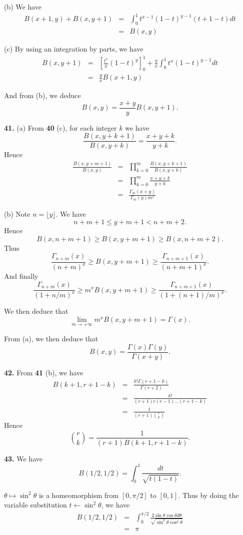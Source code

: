 \documentclass[a4paper,12pt]{article}
\newcommand{\newpar}[1]{\bigskip \noindent \textbf{#1.}}
\newcommand{\subpar}[1]{\medskip \noindent (#1)}
\newcommand{\la}{\leftarrow}
\begin{document}
\subpar{b} We have
\begin{eqnarray*}
  B(x+1, y) + B(x, y+1) &=& \int_0^1 t^{x-1}(1-t)^{y-1}(t + 1 - t)
  dt\\
  &=& B(x, y)
\end{eqnarray*}

\subpar{c} By using an integration by parts, we have
\begin{eqnarray*}
  B(x, y+1) &=& \left[ \frac{t^x}{x}(1-t)^y \right]_0^1 +
  \frac{y}{x}\int_0^1 t^x (1-t)^{y-1} dt \\
  &=& \frac{y}{x} B(x+1, y)
\end{eqnarray*}

And from (b), we deduce
\[ B(x, y) = \frac{x+y}{y} B(x, y+1).\]

\newpar{41} \subpar{a} From \textbf{40} (c), for each integer $k$ we have
\[ \frac{B(x, y + k + 1)}{B(x, y+k)} = \frac{x + y + k}{y+k}.\]
Hence
\begin{eqnarray*}
  \frac{B(x, y+m+1)}{B(x, y)} &=& \prod_{k=0}^m \frac{B(x,
    y+k+1)}{B(x, y+k)} \\
  &=& \prod_{k=0}^m \frac{x+y+k}{y+k} \\
  &=& \frac{\Gamma_m(x+y)}{\Gamma_m(y)m^x}
\end{eqnarray*}

\subpar{b} Note $n = \lfloor y\rfloor$.  We have
\[ n + m + 1 \le y + m + 1 < n+m+2.\]
Hence
\[ B(x, n+m+1) \ge B(x, y+m+1) \ge B(x, n+m+2).\]
Thus
\[ \frac{\Gamma_{n+m}(x)}{(n+m)^x} \ge B(x, y+m+1) \ge
\frac{\Gamma_{n+m+1}(x)}{(n+m+1)^x}.\]
And finally
\[ \frac{\Gamma_{n+m}(x)}{(1+n/m)^x} \ge m^x B(x, y+m+1) \ge
\frac{\Gamma_{n+m+1}(x)}{(1+(n+1)/m)^x}.\]

We then deduce that
\[ \lim_{m \to +\infty} m^x B(x, y+m+1) = \Gamma(x).\]

From (a), we then deduce that
\[ B(x, y) = \frac{\Gamma(x) \Gamma(y)}{\Gamma(x+y)}.\]

\newpar{42}  From \textbf{41} (b), we have
\begin{eqnarray*}
  B(k+1, r+1-k) &=& \frac{k!\Gamma(r+1-k)}{\Gamma(r+2)} \\
  &=& \frac{k!}{(r+1)r(r-1) \ldots (r+1-k)} \\
  &=& \frac{1}{(r+1){r \choose k}}
\end{eqnarray*}
Hence
\[ {r \choose k} = \frac{1}{(r+1)B(k+1, r+1-k)}.\]

\newpar{43} We have
\[ B(1/2, 1/2) = \int_0^1 \frac{dt}{\sqrt{t(1-t)}}.\]

$\theta \mapsto \sin^2\theta$ is a homeomorphism from $[0, \pi/2]$ to
$[0, 1]$. Thus by doing the variable substitution $t \la
\sin^2\theta$, we have
\begin{eqnarray*}
  B(1/2, 1/2) &=& \int_0^{\pi/2} \frac{2 \sin\theta \cos\theta
    d\theta}{\sqrt{\sin^2\theta \cos^2\theta}} \\
  &=& \pi
\end{eqnarray*}
\end{document}
